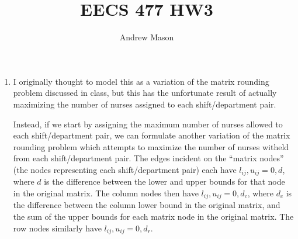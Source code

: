 \documentclass[12pt]{article}
\title{EECS 477 HW3}
\author{Andrew Mason}
\begin{document}
\maketitle

\begin{enumerate}
    \item
        I originally thought to model this as a variation of the matrix
        rounding problem discussed in class, but this has the unfortunate
        result of actually maximizing the number of nurses assigned to each
        shift/department pair.

        Instead, if we start by assigning the maximum number of nurses allowed
        to each shift/department pair, we can formulate another variation of
        the matrix rounding problem which attempts to maximize the number of
        nurses witheld from each shift/department pair. The edges incident on
        the ``matrix nodes'' (the nodes representing each shift/department
        pair) each have $l_{ij},u_{ij}=0,d$, where $d$ is the difference
        between the lower and upper bounds for that node in the original
        matrix. The column nodes then have $l_{ij},u_{ij}=0, d_c$, where $d_c$
        is the difference between the column lower bound in the original
        matrix, and the sum of the upper bounds for each matrix node in the
        original matrix. The row nodes similarly have $l_{ij},u_{ij}=0,d_r$.


\end{enumerate}
\end{document}
